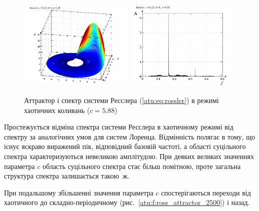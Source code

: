 \begin{figure}[ht!]
\begin{center}
  \includegraphics[width=0.49\textwidth]{p/cha/ross/ross0-p_xyz_c=05x88.png}
  \hfill
  \includegraphics[width=0.49\textwidth]{p/cha/ross/ross_f-p_f_c=05x88.png}
\end{center}
\caption{Аттрактор і спектр системи Ресслера (\ref{atu:eq:rossler}) в режимі хаотичних коливань ($ c = 5.88 $)}
\label{atu:f:ross_attractor_0588}
\end{figure}


Простежується відміна спектра системи Ресслера в хаотичному
режимі від спектру за аналогічних умов для систем Лоренца. Відмінність
полягає в тому, що існує яскраво виражений пік, відповідний
базовій частоті, а області суцільного спектра характеризуються
невеликою амплітудою. При деяких великих значеннях параметра
$ c $ область суцільного спектра стає більш помітною, проте
загальна структура спектра залишається такою~ж.

При подальшому збільшенні значення параметра
\(c\) спостерігаються переходи від хаотичного до
складно-періодичному (рис.~\ref{atu:f:ross_attractor_2500}) і назад.

